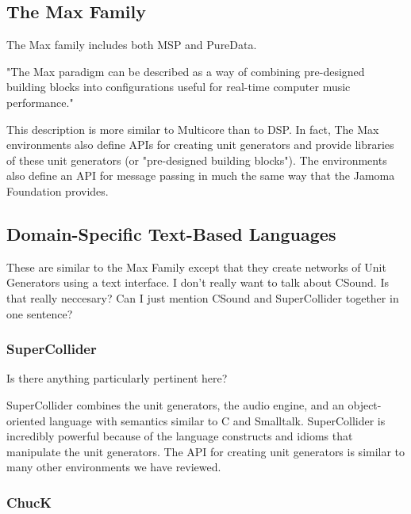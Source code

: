 \documentclass[twoside,10pt]{article}
\begin{document}
\subsection{The Max Family} %

The Max family includes both MSP\cite{Zicarelli:1998} and PureData\cite{Puckette:1996}.

"The Max paradigm can be described as a way of combining pre-designed building blocks into configurations useful for real-time computer music performance."\cite{Puckette:2002_max_at_17}

This description is more similar to Multicore than to DSP.  In fact, The Max environments also define APIs for creating unit generators and provide libraries of these unit generators (or "pre-designed building blocks").  The environments also define an API for message passing in much the same way that the Jamoma Foundation provides.


\subsection{Domain-Specific Text-Based Languages} %

These are similar to the Max Family except that they create networks of Unit Generators using a text interface.  I don't really want to talk about CSound.  Is that really neccesary?  Can I just mention CSound and SuperCollider together in one sentence?


\subsubsection{SuperCollider} %

Is there anything particularly pertinent here?\cite{McCartney:1996}

SuperCollider combines the unit generators, the audio engine, and an object-oriented language with semantics similar to C and Smalltalk.  SuperCollider is incredibly powerful because of the language constructs and idioms that manipulate the unit generators.  The API for creating unit generators is similar to many other environments we have reviewed.


\subsubsection{ChucK} %
\end{document}
